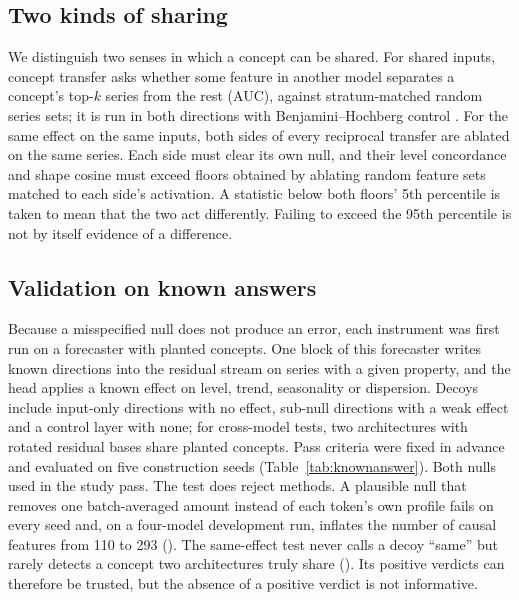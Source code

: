 \subsection{Two kinds of sharing}
\label{sec:sharing}

We distinguish two senses in which a concept can be shared. For shared inputs, concept transfer asks whether some
feature in another model separates a concept's top-$k$ series from the rest (AUC), against stratum-matched random series
sets; it is run in both directions with Benjamini--Hochberg control \citep{benjamini1995fdr}. For the same effect
on the same inputs, both sides of every reciprocal transfer are ablated on the same series. Each side must clear its own
null, and their level concordance and shape cosine must exceed floors obtained by ablating random feature sets matched to each
side's activation. A statistic below both floors' 5th percentile is taken to mean that the two act differently.
Failing to exceed the 95th percentile is not by itself evidence of a difference.

\subsection{Validation on known answers}
\label{sec:knownanswer}

Because a misspecified null does not produce an error, each instrument was first run on a forecaster with planted
concepts.
One block of this forecaster writes known directions into the residual stream on series with a given property, and the
head applies a known effect on level, trend, seasonality or dispersion. Decoys include input-only directions with no
effect, sub-null directions with a weak effect and a control layer with none; for cross-model tests, two architectures
with rotated residual bases share planted concepts. Pass criteria were fixed in advance and evaluated on five
construction seeds (Table~\ref{tab:knownanswer}). Both nulls used in the study pass. The test does reject methods. A
plausible null that removes one batch-averaged amount instead of each token's own profile fails on every seed and, on a
four-model development run, inflates the number of causal features from 110 to 293 (). The
same-effect test never calls a decoy ``same'' but rarely detects a concept two architectures truly share
(). Its positive verdicts can therefore be trusted, but the absence of a positive verdict is not
informative.

